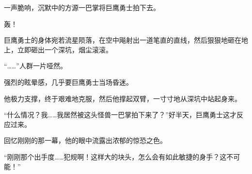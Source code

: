 \begin{this_body}
一声脆响，沉默中的方源一巴掌将巨鹰勇士拍下去。

轰！

巨鹰勇士的身体宛若流星陨落，在空中飚射出一道笔直的直线，然后狠狠地砸在地上，立即砸出一个深坑，烟尘滚滚。

“……”人群一片哑然。

强烈的眩晕感，几乎要巨鹰勇士当场昏迷。

他极力支撑，终于艰难地克服，然后他撑起双臂，一寸寸地从深坑中站起身来。

“什么情况？我……我居然被这头怪兽一巴掌拍下来了？”好半天，巨鹰勇士这才反应过来。

回忆刚刚的那一幕，他的眼中流露出浓郁的惊恐之色。

“刚刚那个出手度……犯规啊！这样大的块头，怎么会有如此敏捷的身手？这不可能！”

\end{this_body}

